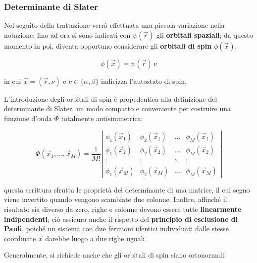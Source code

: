 \subsubsection{Determinante di Slater}

Nel seguito della trattazione verrà effettuata una piccola variazione nella notazione: fino ad ora si sono indicati con $\psi(\vec{r})$ gli \textbf{orbitali spaziali}; da questo momento in poi, diventa opportuno considerare gli \textbf{orbitali di spin} $\phi({\vec{x}})$:

\begin{equation}\label{eqn:orbitale-di-spin}
    \phi(\vec{x}) = \psi(\vec{r})\,\nu
\end{equation}

in cui $\vec{x}=(\vec{r},\nu)$ e $\nu\in\{\alpha,\beta\}$ indicizza l'autostato di spin. 

L'introduzione degli orbitali di spin è propedeutica alla definizione del determinante di Slater, un modo compatto e conveniente per costruire una funzione d'onda $\Phi$ totalmente antisimmetrica:

\begin{equation}\label{eqn:determinante-di-Slater}
    \Phi(\vec{x}_1,...,\vec{x}_M) = \frac{1}{M!}
    \left|
    \begin{matrix}
        \phi_1(\vec{x}_1) & \phi_2(\vec{x}_1) & \dots  & \phi_M(\vec{x}_1) \\
        \phi_1(\vec{x}_2) & \phi_2(\vec{x}_2) & \dots  & \phi_M(\vec{x}_2) \\
        \vdots            & \vdots            & \ddots & \vdots            \\
        \phi_1(\vec{x}_M) & \phi_2(\vec{x}_M) & \dots  & \phi_M(\vec{x}_M) 
    \end{matrix}
    \right|
\end{equation}

questa scrittura sfrutta le proprietà del determinante di una matrice, il cui segno viene invertito quando vengono scambiate due colonne. Inoltre, affinché il risultato sia diverso da zero, righe e colonne devono essere tutte \textbf{linearmente indipendenti}; ciò assicura anche il rispetto del \textbf{principio di esclusione di Pauli}, poiché un sistema con due fermioni identici individuati dalle stesse coordinate $\vec{x}$ darebbe luogo a due righe uguali.

Generalmente, si richiede anche che gli orbitali di spin siano ortonormali:

